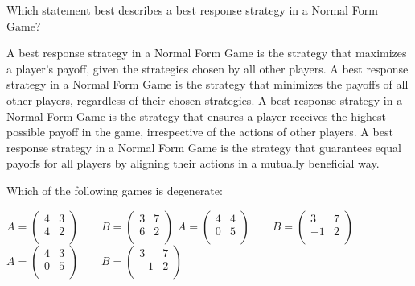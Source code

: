 \documentclass{exam}
\begin{document}
\begin{questions}
        
    \question Which statement best describes a best response strategy in a
    Normal Form Game?
\begin{checkboxes}
\choice A best response strategy in a Normal Form Game is the strategy that maximizes a player's payoff, given the strategies chosen by all other players.
\choice A best response strategy in a Normal Form Game is the strategy that minimizes the payoffs of all other players, regardless of their chosen strategies.
\choice A best response strategy in a Normal Form Game is the strategy that ensures a player receives the highest possible payoff in the game, irrespective of the actions of other players.
\choice A best response strategy in a Normal Form Game is the strategy that guarantees equal payoffs for all players by aligning their actions in a mutually beneficial way.
\end{checkboxes}

\question Which of the following games is degenerate:
    \begin{checkboxes}
        \choice
    \(
        A=\begin{pmatrix}4 & 3 \\
                       4 & 2 \\
        \end{pmatrix}
        \qquad
        B=\begin{pmatrix}3 & 7\\
                       6 & 2\\
        \end{pmatrix}
    \)
        \choice
    \(
        A=\begin{pmatrix}4 & 4 \\
                       0 & 5 \\
        \end{pmatrix}
        \qquad
        B=\begin{pmatrix}3 & 7\\
                       -1 & 2\\
        \end{pmatrix}
    \)
        \choice
    \(
        A=\begin{pmatrix}4 & 3 \\
                       0 & 5 \\
        \end{pmatrix}
        \qquad
        B=\begin{pmatrix}3 & 7\\
                       -1 & 2\\
        \end{pmatrix}
    \)
\end{checkboxes}


\end{questions}
\end{document}
